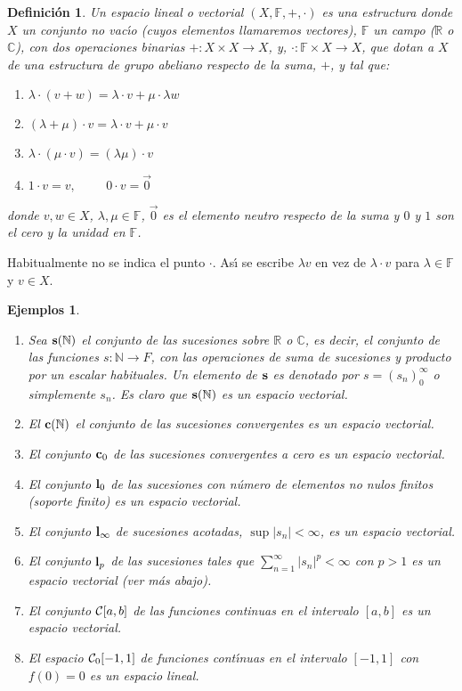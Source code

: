 \documentclass[12pt]{book}
\newtheorem{defn}{\bf Definición}[chapter]
\newtheorem{listaejemplos}{\bf Ejemplos}[chapter]
\begin{document}
\begin{defn} Un espacio lineal o vectorial $(X,\mathbb{F},+,\cdot)$ es una estructura donde   $X$ 
un conjunto no vac\'{\i}o  (cuyos elementos llamaremos vectores), $\mathbb{F}$ un campo ($
\mathbb{R}$ o $\mathbb{C}$), con dos operaciones binarias $+:X\times X\to X$, y, $\cdot:
\mathbb{F}\times X\to X$, que dotan a $X$ de una estructura de grupo abeliano respecto de la 
suma, $+$, y tal que:
\begin{enumerate}
\item $\lambda \cdot (v + w)=\lambda\cdot  v + \mu\cdot \lambda w$
\item $(\lambda + \mu)\cdot  v=\lambda \cdot v + \mu\cdot  v$
\item $\lambda\cdot (\mu\cdot  v)=(\lambda\mu)\cdot v$
\item $1\cdot v=v,\hspace{1cm} 0\cdot v=\vec 0$
\end{enumerate}
donde $v,w \in X$, $\lambda,\mu\in\mathbb{F} $, $\vec 0$ es el elemento neutro respecto de la 
suma y $0$ y $1$ son el cero y la unidad en $\mathbb{F}$. 
\end{defn}
Habitualmente no se indica el punto $\cdot$. As\'{\i} se escribe $\lambda v$ en vez de $
\lambda\cdot v$ para $\lambda\in\mathbb{F} $ y $v\in X$.
\begin{listaejemplos}\quad\begin{enumerate}\par
\item Sea ${\bf s}(\mathbb{N})$ el conjunto de las sucesiones sobre $\mathbb{R}$ o $\mathbb{C}$, 
es decir, el conjunto de las funciones $s:\mathbb{N}\to F$, con las operaciones de suma de 
sucesiones y producto por un escalar habituales. Un elemento de ${\bf s}$ es denotado por 
$s=(s_n)_{0}^\infty$ o simplemente $s_n$. Es claro que ${\bf s}(\mathbb{N})$ es un espacio 
vectorial.
\item El ${\bf c}(\mathbb{N})$ el conjunto de las sucesiones convergentes es un espacio vectorial.
\item El conjunto ${\bf c}_0$ de las sucesiones convergentes a cero es un espacio vectorial.
\item El conjunto ${\bf l}_0$ de las sucesiones con número de elementos no nulos  finitos (soporte 
finito)  es un espacio vectorial.
\item El conjunto ${\bf l}_\infty$ de sucesiones acotadas, $\sup \vert s_n\vert<\infty$, es un espacio 
vectorial.
\item El conjunto ${\bf l}_p$ de las sucesiones tales que $\sum_{n=1}^\infty \vert s_n\vert^p<\infty$ 
con $p>1$ es un espacio vectorial (ver m\'as abajo).
\item El conjunto ${\cal C}[a,b]$ de las funciones continuas en el intervalo $[a,b]$ es un espacio 
vectorial.
\item El espacio ${\cal C}_0[-1,1]$ de funciones cont\'{\i}nuas en el intervalo $[-1,1]$ con $f(0)=0$ 
es un espacio lineal. 
\end{enumerate}\end{listaejemplos}
\end{document}
